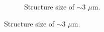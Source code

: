 \begin{figure}[!t]
\begin{subfigure}[t]{0.3\linewidth}
	\caption{Structure size of $\sim$3 $\mu$m.}
	\label{fig:b2d8_q8}
\end{subfigure}
\end{figure}
